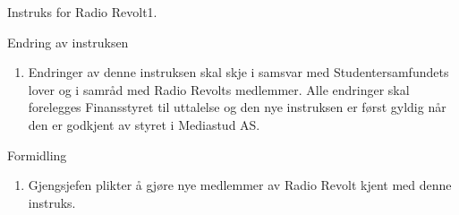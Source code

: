 \begin{instruks}{Instruks for Radio Revolt}{1. }{ }
    \begin{instruksledd}{Endring av instruksen}
        \begin{enumerate}
            \item Endringer av denne instruksen skal skje i samsvar med Studentersamfundets
                lover og i samråd med Radio Revolts medlemmer. Alle endringer skal forelegges Finansstyret til
                uttalelse og den nye instruksen er først gyldig når den er godkjent av styret i Mediastud AS.
        \end{enumerate}
    \end{instruksledd}
    
    \begin{instruksledd}{Formidling}
        \begin{enumerate}
            \item Gjengsjefen plikter å gjøre nye medlemmer av Radio Revolt kjent med denne
                instruks.
        \end{enumerate}
    \end{instruksledd}

\end{instruks}


